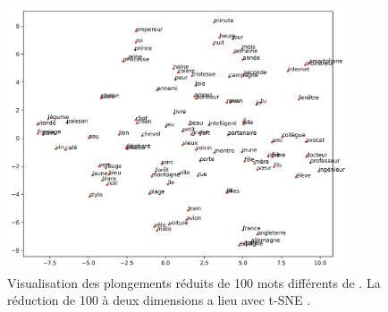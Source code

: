 \documentclass[12pt]{article}
\begin{document}
\newpage
\clearpage
\vspace*{-1in}
\begin{figure}[t!]
    \centering
    \includegraphics[width=0.9\textwidth]{img/embedding_plot.png}
    \caption{Visualisation des plongements réduits de 100 mots différents de \cite{fares-etal-2017-word}. La réduction de 100 à deux dimensions a lieu avec t-SNE \citep{van2008visualizing}.}
    \label{fig:embeddings}
\end{figure}
\end{document}
